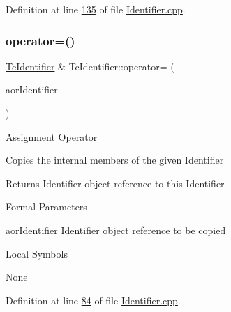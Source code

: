 Definition at line \mbox{\hyperlink{_identifier_8cpp_source_l00135}{135}} of file \mbox{\hyperlink{_identifier_8cpp_source}{Identifier.\+cpp}}.

\mbox{\label{class_g_n_common_1_1_n_notification_1_1_tc_identifier_a6a836e2b8afe92c207de676e574009ea}} 
\subsubsection{\texorpdfstring{operator=()}{operator=()}}
{\footnotesize\ttfamily \mbox{\hyperlink{class_g_n_common_1_1_n_notification_1_1_tc_identifier}{Tc\+Identifier}} \& Tc\+Identifier\+::operator= (\begin{DoxyParamCaption}\item[{const \mbox{\hyperlink{class_g_n_common_1_1_n_notification_1_1_tc_identifier}{Tc\+Identifier}} \&}]{aor\+Identifier }\end{DoxyParamCaption})}

Assignment Operator

Copies the internal members of the given Identifier

\begin{DoxyReturn}{Returns}
Identifier object reference to this Identifier
\end{DoxyReturn}
\begin{DoxyParagraph}{Formal Parameters}

\begin{DoxyPre}{\ttfamily [ in ]  aorIdentifier    Identifier object reference to be copied }\end{DoxyPre}

\end{DoxyParagraph}
\begin{DoxyParagraph}{Local Symbols}

\begin{DoxyPre}{\ttfamily  None }\end{DoxyPre}
 
\end{DoxyParagraph}


Definition at line \mbox{\hyperlink{_identifier_8cpp_source_l00084}{84}} of file \mbox{\hyperlink{_identifier_8cpp_source}{Identifier.\+cpp}}.

